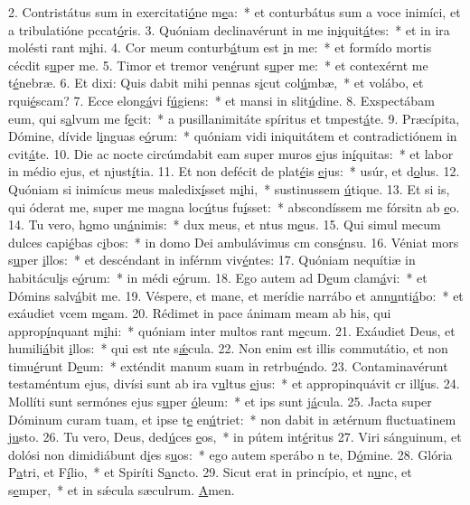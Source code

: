 2. Contristátus sum in exercitati\uline{ó}ne m\uline{e}a:~* et conturbátus sum a voce inimíci, et a tribulatióne pccat\uline{ó}ris.
3. Quóniam declinavérunt in me in\uline{i}quit\uline{á}tes:~* et in ira molésti rant m\uline{i}hi.
4. Cor meum conturb\uline{á}tum est \uline{i}n me:~* et formído mortis cécdit s\uline{u}per me.
5. Timor et tremor ven\uline{é}runt s\uline{u}per me:~* et contexérnt me t\uline{é}nebræ.
6. Et dixi: Quis dabit mihi pennas s\uline{i}cut col\uline{ú}mbæ,~* et volábo, et rqui\uline{é}scam?
7. Ecce elong\uline{á}vi f\uline{ú}giens:~* et mansi in slit\uline{ú}dine.
8. Exspectábam eum, qui s\uline{a}lvum me f\uline{e}cit:~* a pusillanimitáte spíritus et tmpest\uline{á}te.
9. Præcípita, Dómine, dívide l\uline{i}nguas e\uline{ó}rum:~* quóniam vidi iniquitátem et contradictiónem in cvit\uline{á}te.
10. Die ac nocte circúmdabit eam super muros \uline{e}jus in\uline{í}quitas:~* et labor in médio ejus, et njust\uline{í}tia.
11. Et non defécit de plat\uline{é}is \uline{e}jus:~* usúr, et d\uline{o}lus.
12. Quóniam si inimícus meus maledix\uline{í}sset m\uline{i}hi,~* sustinussem \uline{ú}tique.
13. Et si is, qui óderat me, super me magna loc\uline{ú}tus fu\uline{í}sset:~* abscondíssem me fórsitn ab \uline{e}o.
14. Tu vero, h\uline{o}mo un\uline{á}nimis:~* dux meus, et ntus m\uline{e}us.
15. Qui simul mecum dulces capi\uline{é}bas c\uline{i}bos:~* in domo Dei ambulávimus cm cons\uline{é}nsu.
16. Véniat mors s\uline{u}per \uline{i}llos:~* et descéndant in inférnm viv\uline{é}ntes:
17. Quóniam nequítiæ in habitácul\uline{i}s e\uline{ó}rum:~* in médi e\uline{ó}rum.
18. Ego autem ad D\uline{e}um clam\uline{á}vi:~* et Dómins salv\uline{á}bit me.
19. Véspere, et mane, et merídie narrábo et ann\uline{u}nti\uline{á}bo:~* et exáudiet vcem m\uline{e}am.
20. Rédimet in pace ánimam meam ab his, qui approp\uline{í}nquant m\uline{i}hi:~* quóniam inter multos rant m\uline{e}cum.
21. Exáudiet Deus, et humili\uline{á}bit \uline{i}llos:~* qui est nte s\uline{ǽ}cula.
22. Non enim est illis commutátio, et non timu\uline{é}runt D\uline{e}um:~* exténdit manum suam in retrbu\uline{é}ndo.
23. Contaminavérunt testaméntum ejus, divísi sunt ab ira v\uline{u}ltus \uline{e}jus:~* et appropinquávit cr ill\uline{í}us.
24. Mollíti sunt sermónes ejus s\uline{u}per \uline{ó}leum:~* et ips sunt j\uline{á}cula.
25. Jacta super Dóminum curam tuam, et ipse t\uline{e} en\uline{ú}triet:~* non dabit in ætérnum fluctuatinem j\uline{u}sto.
26. Tu vero, Deus, ded\uline{ú}ces \uline{e}os,~* in pútem int\uline{é}ritus
27. Viri sánguinum, et dolósi non dimidiábunt d\uline{i}es s\uline{u}os:~* ego autem sperábo n te, D\uline{ó}mine.
28. Glória P\uline{a}tri, et F\uline{í}lio,~* et Spiríti S\uline{a}ncto.
29. Sicut erat in princípio, et n\uline{u}nc, et s\uline{e}mper,~* et in sǽcula sæculrum. \uline{A}men.
